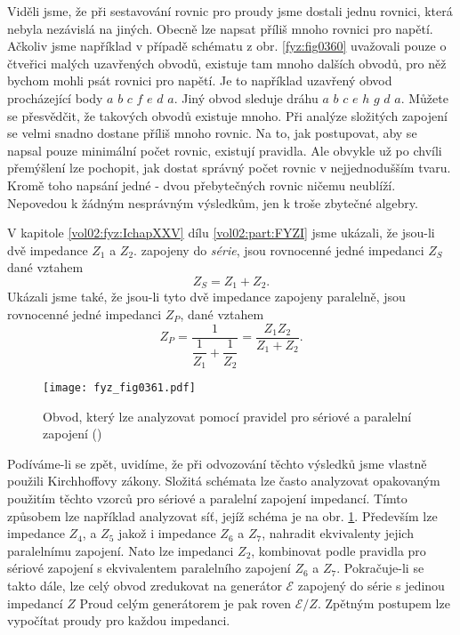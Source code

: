   Viděli jsme, že při sestavování rovnic pro proudy jsme dostali jednu rovnici, která nebyla 
  nezávislá na jiných. Obecně lze napsat příliš mnoho rovnici pro napětí. Ačkoliv jsme například v 
  případě schématu z obr. \ref{fyz:fig0360} uvažovali pouze o čtveřici malých uzavřených obvodů, 
  existuje tam mnoho dalších obvodů, pro něž bychom mohli psát rovnici pro napětí. Je to například 
  uzavřený obvod procházející body \(a\) \(b\) \(c\) \(f\) \(e\) \(d\) \(a\). Jiný obvod sleduje 
  dráhu \(a\) \(b\) \(c\) \(e\) \(h\) \(g\) \(d\) \(a\). Můžete se přesvědčit, že takových obvodů 
  existuje mnoho. Při analýze složitých zapojení se velmi snadno dostane příliš mnoho rovnic. Na 
  to, jak postupovat, aby se napsal pouze minimální počet rovnic, existují pravidla. Ale obvykle už 
  po chvíli přemýšlení lze pochopit, jak dostat správný počet rovnic v nejjednodušším tvaru. Kromě 
  toho napsání jedné - dvou přebytečných rovnic ničemu neublíží. Nepovedou k žádným nesprávným 
  výsledkům, jen k troše zbytečné algebry.
   
  V kapitole \ref{vol02:fyz:IchapXXV} dílu \ref{vol02:part:FYZI} jsme ukázali, že jsou-li dvě impedance \(Z_1\) 
  a \(Z_2\). zapojeny do \emph{série}, jsou rovnocenné jedné impedanci \(Z_S\) dané vztahem
  \begin{equation}\label{fyz:eq487}
    Z_S = Z_1 + Z_2.
  \end{equation}
  Ukázali jsme také, že jsou-li tyto dvě impedance zapojeny paralelně, jsou rovnocenné jedné 
  impedanci \(Z_P\), dané vztahem
  \begin{equation}\label{fyz:eq488}
    Z_P = \dfrac{1}{\dfrac{1}{Z_1} + \dfrac{1}{Z_2}} = \frac{Z_1Z_2}{Z_1 + Z_2}.
  \end{equation}
  
  \begin{figure}[ht!] %
    \centering
    \texttt{[image: fyz\_fig0361.pdf]}
    \caption{Obvod, který lze analyzovat pomocí pravidel pro sériové a paralelní zapojení
             (\cite[s.~402]{Feynman02})}
    \label{fyz:fig0361}
  \end{figure}
  
  Podíváme-li se zpět, uvidíme, že při odvozování těchto výsledků jsme vlastně použili Kirchhoffovy 
  zákony. Složitá schémata lze často analyzovat opakovaným použitím těchto vzorců pro sériové a 
  paralelní zapojení impedancí. Tímto způsobem lze například analyzovat síť, jejíž schéma je na 
  obr. \ref{fyz:fig0361}. Především lze impedance \(Z_4\), a \(Z_5\) jakož i impedance \(Z_6\) a 
  \(Z_7\), nahradit ekvivalenty jejich paralelnímu zapojení. Nato lze impedanci \(Z_2\), kombinovat 
  podle pravidla pro sériové zapojení s ekvivalentem paralelního zapojení \(Z_6\) a \(Z_7\). 
  Pokračuje-li se takto dále, lze celý obvod zredukovat na generátor \(\mathscr{E}\) zapojený do 
  série s jedinou impedancí \(Z\) Proud celým generátorem je pak roven \(\mathscr{E}/Z\). Zpětným 
  postupem lze vypočítat proudy pro každou impedanci.

